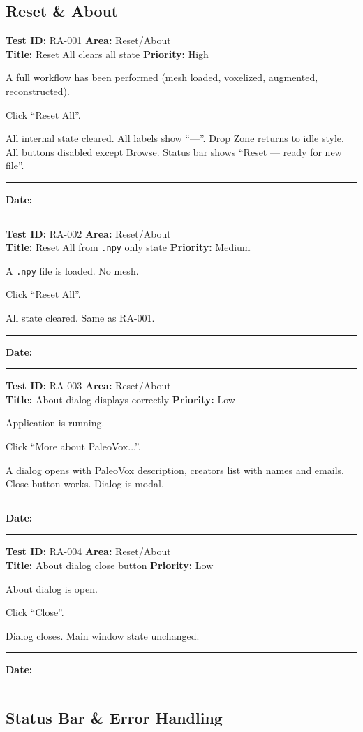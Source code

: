 \documentclass[12pt,a4paper]{article}
\newenvironment{testcase}[4]{%
  \smallskip
  \noindent\textbf{Test ID:} #1 \hfill \textbf{Area:} #2 \\
  \textbf{Title:} #3 \hfill \textbf{Priority:} #4
  \begin{description}[leftmargin=2em,style=nextline]
    \item[\textbf{Preconditions:}]
}{%
    \item[\textbf{Steps:}]
    \item[\textbf{Expected Result:}]
    \item[\textbf{Status:}] \rule{3cm}{0.4pt} \hspace{1em} \textbf{Date:} \rule{3cm}{0.4pt}
    \item[\textbf{Notes:}]
  \end{description}
  \smallskip
}
\begin{document}
\subsection{Reset \& About}

\begin{testcase}{RA-001}{Reset/About}{Reset All clears all state}{High}
  \item A full workflow has been performed (mesh loaded, voxelized, augmented, reconstructed).
  \item Click ``Reset All''.
  \item All internal state cleared. All labels show ``---''. Drop Zone returns to idle style. All buttons disabled except Browse. Status bar shows ``Reset --- ready for new file''.
\end{testcase}

\begin{testcase}{RA-002}{Reset/About}{Reset All from \texttt{.npy} only state}{Medium}
  \item A \texttt{.npy} file is loaded. No mesh.
  \item Click ``Reset All''.
  \item All state cleared. Same as RA-001.
\end{testcase}

\begin{testcase}{RA-003}{Reset/About}{About dialog displays correctly}{Low}
  \item Application is running.
  \item Click ``More about PaleoVox...''.
  \item A dialog opens with PaleoVox description, creators list with names and emails. Close button works. Dialog is modal.
\end{testcase}

\begin{testcase}{RA-004}{Reset/About}{About dialog close button}{Low}
  \item About dialog is open.
  \item Click ``Close''.
  \item Dialog closes. Main window state unchanged.
\end{testcase}

\subsection{Status Bar \& Error Handling}
\end{document}
